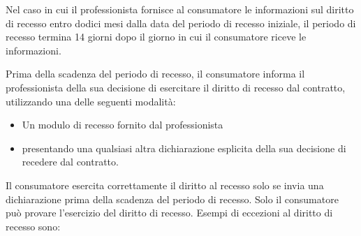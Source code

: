 Nel caso in cui il professionista fornisce al consumatore le informazioni sul diritto di
recesso entro dodici mesi dalla data del periodo di recesso iniziale, il periodo di
recesso termina 14 giorni dopo il giorno in cui il consumatore riceve le informazioni.


Prima della scadenza del periodo di recesso, il consumatore informa il professionista
della sua decisione di esercitare il diritto di recesso dal contratto, utilizzando una
delle seguenti modalità:
\begin{itemize}
    \item Un modulo di recesso fornito dal professionista
    \item presentando una qualsiasi altra dichiarazione esplicita della sua decisione di recedere dal contratto.
\end{itemize}
Il consumatore esercita correttamente il diritto al recesso solo se invia una
dichiarazione prima della scadenza del periodo di recesso.
Solo il consumatore può provare l'esercizio del diritto di recesso.
\newline
Esempi di eccezioni al diritto di recesso sono:

